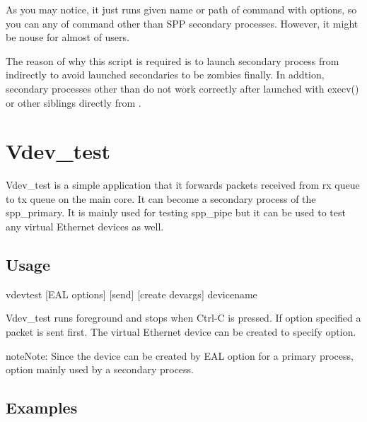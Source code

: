 \documentclass[a4paper,11pt,openany,oneside,english]{sphinxmanual}
\begin{document}
As you may notice, it just runs given name or path of command with options,
so you can any of command other than SPP secondary processes. However, it
might be nouse for almost of users.

The reason of why this script is required is to launch secondary process from
 indirectly to avoid launched secondaries to be zombies finally.
In addtion, secondary processes other than  do not work correctly
after launched with execv() or other siblings directly from .


\section{Vdev\_test}
\label{\detokenize{tools/vdev_test:vdev-test}}\label{\detokenize{tools/vdev_test:spp-tools-vdev-test}}\label{\detokenize{tools/vdev_test::doc}}
Vdev\_test is a simple application that it forwards packets received
from rx queue to tx queue on the main core. It can become a secondary
process of the spp\_primary. It is mainly used for testing spp\_pipe
but it can be used to test any virtual Ethernet devices as well.


\subsection{Usage}
\label{\detokenize{tools/vdev_test:usage}}
\begin{sphinxVerbatim}[commandchars=\\\{\},formatcom=\footnotesize]
vdev\PYGZus{}test [EAL options] \PYGZhy{}\PYGZhy{} [\PYGZhy{}\PYGZhy{}send] [\PYGZhy{}\PYGZhy{}create devargs] device\PYGZhy{}name
\end{sphinxVerbatim}

Vdev\_test runs foreground and stops when Ctrl-C is pressed. If 
option specified a packet is sent first. The virtual Ethernet device can
be created to specify  option.

\begin{sphinxadmonition}{note}{Note:}
Since the device can be created by EAL  option for a
primary process,  option mainly used by a secondary
process.
\end{sphinxadmonition}


\subsection{Examples}
\label{\detokenize{tools/vdev_test:examples}}
\end{document}
